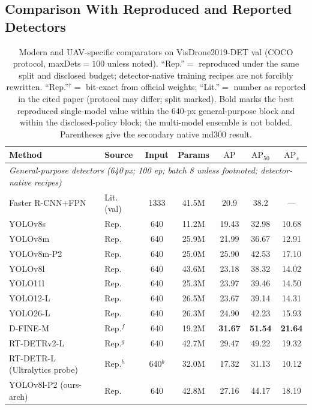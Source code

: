 \documentclass[journal]{IEEEtran}
\newcommand{\ap}{\ensuremath{\mathrm{AP}}}
\newcommand{\apf}{\ensuremath{\mathrm{AP}_{50}}}
\newcommand{\aps}{\ensuremath{\mathrm{AP}_{s}}}
\newcommand{\visdrone}{VisDrone2019-DET}
\begin{document}
\subsection{Comparison With Reproduced and Reported Detectors}
\label{sec:main}
\begin{table}[!t]
\centering
\caption{Modern and UAV-specific comparators on \visdrone{} val (COCO protocol, \textup{maxDets}$=100$ unless noted). ``Rep.''$=$ reproduced under the same split and disclosed budget; detector-native training recipes are not forcibly rewritten. ``Rep.''$^\dagger$$=$ bit-exact from official weights; ``Lit.''$=$ number as reported in the cited paper (protocol may differ; split marked). Bold marks the best reproduced single-model value within the 640-px general-purpose block and within the disclosed-policy block; the multi-model ensemble is not bolded. Parentheses give the secondary native md300 result.}
\label{tab:main}
\begin{tabular}{llccccc}
\toprule
Method & Source & Input & Params & \ap & \apf & \aps \\
\midrule
\multicolumn{7}{l}{\emph{General-purpose detectors (640\,px; 100 ep; batch 8 unless footnoted; detector-native recipes)}}\\
Faster R-CNN+FPN \cite{frcnn} & Lit. (val) & 1333 & 41.5M & 20.9 & 38.2 & --- \\
YOLOv8s \cite{yolov8} & Rep. & 640 & 11.2M & 19.43 & 32.98 & 10.68 \\
YOLOv8m \cite{yolov8} & Rep. & 640 & 25.9M & 21.99 & 36.67 & 12.91 \\
YOLOv8m-P2 & Rep. & 640 & 25.0M & 25.90 & 42.53 & 17.10 \\
YOLOv8l \cite{yolov8} & Rep. & 640 & 43.6M & 23.18 & 38.32 & 14.02 \\
YOLO11l \cite{yolo11} & Rep. & 640 & 25.3M & 23.97 & 39.46 & 14.50 \\
YOLO12-L \cite{yolo12} & Rep. & 640 & 26.5M & 23.67 & 39.14 & 14.31 \\
YOLO26-L \cite{yolo26} & Rep. & 640 & 26.3M & 24.90 & 42.23 & 15.93 \\
D-FINE-M \cite{dfine} & Rep.$^{f}$ & 640 & 19.2M & \textbf{31.67} & \textbf{51.54} & \textbf{21.64} \\
RT-DETRv2-L \cite{rtdetrv2} & Rep.$^{g}$ & 640 & 42.7M & 29.47 & 49.22 & 19.32 \\
RT-DETR-L (Ultralytics probe) \cite{rtdetr} & Rep.$^{h}$ & 640$^{b}$ & 32.0M & 17.32 & 31.13 & 10.12 \\
YOLOv8l-P2 (ours-arch) & Rep. & 640 & 42.8M & 27.16 & 44.17 & 18.19 \\

\end{tabular}
\end{table}
\end{document}
